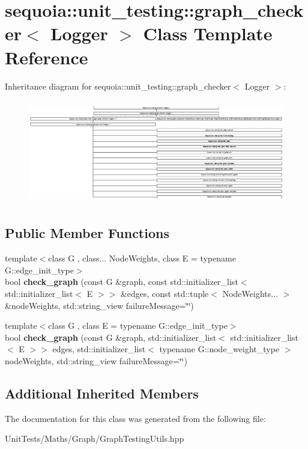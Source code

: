 \hypertarget{classsequoia_1_1unit__testing_1_1graph__checker}{}\section{sequoia\+::unit\+\_\+testing\+::graph\+\_\+checker$<$ Logger $>$ Class Template Reference}
\label{classsequoia_1_1unit__testing_1_1graph__checker}
Inheritance diagram for sequoia\+::unit\+\_\+testing\+::graph\+\_\+checker$<$ Logger $>$\+:\begin{figure}[H]
\begin{center}
\leavevmode
\includegraphics[height=4.559387cm]{classsequoia_1_1unit__testing_1_1graph__checker}
\end{center}
\end{figure}
\subsection*{Public Member Functions}
\begin{DoxyCompactItemize}
\item 
\mbox{\label{classsequoia_1_1unit__testing_1_1graph__checker_ad7cdad346a5cd8c90cbf336e7feb1159}} 
{\footnotesize template$<$class G , class... Node\+Weights, class E  = typename G\+::edge\+\_\+init\+\_\+type$>$ }\\bool {\bfseries check\+\_\+graph} (const G \&graph, const std\+::initializer\+\_\+list$<$ std\+::initializer\+\_\+list$<$ E $>$$>$ \&edges, const std\+::tuple$<$ Node\+Weights... $>$ \&node\+Weights, std\+::string\+\_\+view failure\+Message=\char`\"{}\char`\"{})
\item 
\mbox{\label{classsequoia_1_1unit__testing_1_1graph__checker_a0b10f8747b5c9bed39a9e33315d245c1}} 
{\footnotesize template$<$class G , class E  = typename G\+::edge\+\_\+init\+\_\+type$>$ }\\bool {\bfseries check\+\_\+graph} (const G \&graph, std\+::initializer\+\_\+list$<$ std\+::initializer\+\_\+list$<$ E $>$$>$ edges, std\+::initializer\+\_\+list$<$ typename G\+::node\+\_\+weight\+\_\+type $>$ node\+Weights, std\+::string\+\_\+view failure\+Message=\char`\"{}\char`\"{})
\end{DoxyCompactItemize}
\subsection*{Additional Inherited Members}


The documentation for this class was generated from the following file\+:\begin{DoxyCompactItemize}
\item 
Unit\+Tests/\+Maths/\+Graph/Graph\+Testing\+Utils.\+hpp\end{DoxyCompactItemize}
